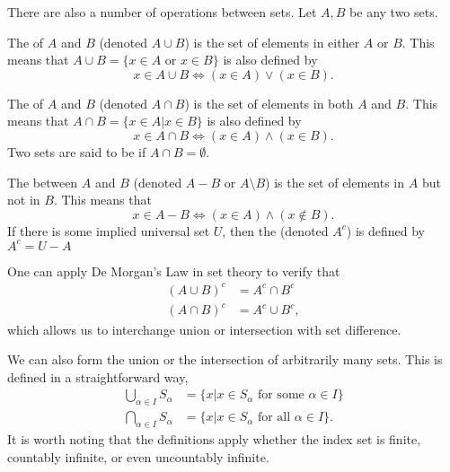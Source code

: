 There are also a number of operations between sets.
Let $A,B$ be any two sets.
\begin{definition}
The  of $A$ and $B$ (denoted $A\cup B$) is the set of elements in either $A$ or $B$.
This means that $A \cup B = \{ x\in A \textrm{ or } x\in B \}$ is also defined by
\[ x\in A\cup B \Leftrightarrow (x\in A)\vee (x\in B). \]
\end{definition}

\begin{definition}
The  of $A$ and $B$ (denoted $A\cap B$) is the set of elements in both $A$ and $B$.
This means that $A\cap B = \{x\in A | x\in B \}$ is also defined by
\[ x\in A\cap B \Leftrightarrow (x\in A)\wedge (x\in B). \]
Two sets are said to be  if $A\cap B = \emptyset$.
\end{definition}

\begin{definition}
The  between $A$ and $B$ (denoted $A-B$ or $A \setminus \!B$) is the set of elements in $A$ but not in $B$.
This means that
\[ x\in A-B \Leftrightarrow (x\in A)\wedge (x\notin B). \]
If there is some implied universal set $U$, then the  (denoted $A^c$) is defined by $A^c = U-A$
\end{definition}

One can apply De Morgan's Law in set theory to verify that
\begin{align*}
(A \cup B)^c & = A^c \cap B^c \\
(A \cap B)^c & = A^c \cup B^c,
\end{align*}
which allows us to interchange union or intersection with set difference.

We can also form the union or the intersection of arbitrarily many sets.
This is defined in a straightforward way,
\begin{align*}
\bigcup_{\alpha \in I} S_{\alpha}
&= \{ x | x \in S_{\alpha} \text{ for some } \alpha \in I \} \\
\bigcap_{\alpha \in I} S_{\alpha}
&= \{ x | x \in S_{\alpha} \text{ for all } \alpha \in I \} .
\end{align*}
It is worth noting that the definitions apply whether the index set is finite, countably infinite, or even uncountably infinite.

